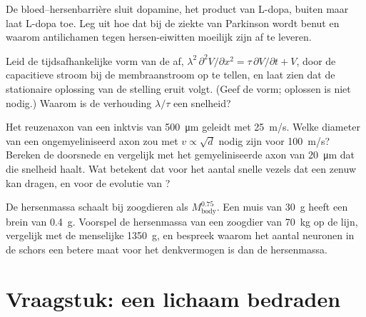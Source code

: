 \begin{exercise}[$\star\star$]\label{exo:b3:nervous-systems:9}
De bloed--hersenbarrière sluit dopamine, het product van L-dopa, buiten
maar laat L-dopa toe. Leg uit hoe dat bij de ziekte van Parkinson wordt
benut en waarom antilichamen tegen hersen-eiwitten moeilijk zijn af te
leveren.
\end{exercise}

\begin{exercise}[$\star\star\star$]\label{exo:b3:nervous-systems:10}
Leid de tijdsafhankelijke vorm van de  af,
$\lambda^{2}\,\partial^{2}
V/\partial x^{2} = \tau\,\partial V/\partial t + V$, door de
capacitieve stroom bij de membraanstroom op te tellen, en laat zien dat
de stationaire oplossing van de stelling eruit volgt. (Geef de vorm;
oplossen is niet nodig.) Waarom is de verhouding $\lambda/\tau$ een
snelheid?
\end{exercise}

\begin{exercise}[$\star\star\star$]\label{exo:b3:nervous-systems:11}
Het reuzenaxon van een inktvis van \qty{500}{\micro m} geleidt met
\qty{25}{m/s}. Welke diameter van een ongemyeliniseerd axon zou met
$v \propto \sqrt{d}$ nodig zijn voor \qty{100}{m/s}? Bereken de
doorsnede en vergelijk met het gemyeliniseerde axon van
\qty{20}{\micro m} dat die snelheid haalt. Wat betekent dat voor het
aantal snelle vezels dat een zenuw kan dragen, en voor de evolutie van
?
\end{exercise}

\begin{exercise}[$\star\star\star$]\label{exo:b3:nervous-systems:12}
De hersenmassa schaalt bij zoogdieren als $M_{\text{body}}^{0.75}$. Een
muis van \qty{30}{g} heeft een brein van \qty{0.4}{g}. Voorspel de
hersenmassa van een zoogdier van \qty{70}{kg} op de lijn, vergelijk met
de menselijke \qty{1350}{g}, en bespreek waarom het aantal neuronen in
de schors een betere maat voor het denkvermogen is dan de hersenmassa.
\end{exercise}

\section{Vraagstuk: een lichaam bedraden}

